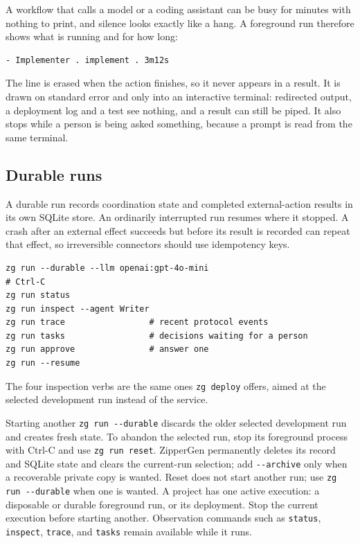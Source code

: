 \documentclass[11pt,a4paper]{article}
\begin{document}
A workflow that calls a model or a coding assistant can be busy for minutes
with nothing to print, and silence looks exactly like a hang. A foreground run
therefore shows what is running and for how long:

\begin{lstlisting}[style=shell]
- Implementer . implement . 3m12s
\end{lstlisting}

The line is erased when the action finishes, so it never appears in a result.
It is drawn on standard error and only into an interactive terminal: redirected
output, a deployment log and a test see nothing, and a result can still be
piped. It also stops while a person is being asked something, because a prompt
is read from the same terminal.

\subsection{Durable runs}

A durable run records coordination state and completed external-action results
in its own SQLite store. An ordinarily interrupted run resumes where it
stopped. A crash after an external effect succeeds but before its result is
recorded can repeat that effect, so irreversible connectors should use
idempotency keys.

\begin{lstlisting}[style=shell]
zg run --durable --llm openai:gpt-4o-mini
# Ctrl-C
zg run status
zg run inspect --agent Writer
zg run trace                 # recent protocol events
zg run tasks                 # decisions waiting for a person
zg run approve               # answer one
zg run --resume
\end{lstlisting}

The four inspection verbs are the same ones \texttt{zg deploy} offers, aimed
at the selected development run instead of the service.

Starting another \texttt{zg run -{}-durable} discards the older selected
development run and creates fresh state. To abandon the selected run, stop its
foreground process with Ctrl-C and use \texttt{zg run reset}. ZipperGen
permanently deletes its record and SQLite state and clears the current-run
selection; add \texttt{-{}-archive} only when a recoverable private copy is
wanted. Reset does not start another run; use \texttt{zg run -{}-durable} when
one is wanted. A project has one active execution: a disposable or durable
foreground run, or its deployment. Stop the current execution before starting
another. Observation commands such as \texttt{status}, \texttt{inspect},
\texttt{trace}, and \texttt{tasks} remain available while it runs.
\end{document}
